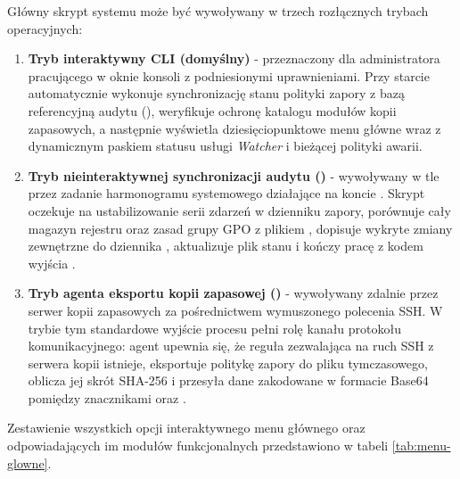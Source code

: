 Główny skrypt systemu może być wywoływany w trzech rozłącznych trybach operacyjnych:
\begin{enumerate}
    \item \textbf{Tryb interaktywny CLI (domyślny)} - przeznaczony dla administratora pracującego w oknie konsoli z podniesionymi uprawnieniami. Przy starcie automatycznie wykonuje synchronizację stanu polityki zapory z bazą referencyjną audytu (), weryfikuje ochronę katalogu modułów kopii zapasowych, a następnie wyświetla dziesięciopunktowe menu główne wraz z dynamicznym paskiem statusu usługi \textit{Watcher} i bieżącej polityki awarii.
    \item \textbf{Tryb nieinteraktywnej synchronizacji audytu ()} - wywoływany w tle przez zadanie harmonogramu systemowego \code{\FirewallAudit\Watcher} działające na koncie . Skrypt oczekuje na ustabilizowanie serii zdarzeń w dzienniku zapory, porównuje cały magazyn rejestru oraz zasad grupy GPO z plikiem , dopisuje wykryte zmiany zewnętrzne do dziennika , aktualizuje plik stanu  i kończy pracę z kodem wyjścia .
    \item \textbf{Tryb agenta eksportu kopii zapasowej ()} - wywoływany zdalnie przez serwer kopii zapasowych za pośrednictwem wymuszonego polecenia SSH. W trybie tym standardowe wyjście procesu pełni rolę kanału protokołu komunikacyjnego: agent upewnia się, że reguła zezwalająca na ruch SSH z serwera kopii istnieje, eksportuje politykę zapory do pliku tymczasowego, oblicza jej skrót SHA-256 i przesyła dane zakodowane w formacie Base64 pomiędzy znacznikami  oraz .
\end{enumerate}

Zestawienie wszystkich opcji interaktywnego menu głównego oraz odpowiadających im modułów funkcjonalnych przedstawiono w tabeli \ref{tab:menu-glowne}.

